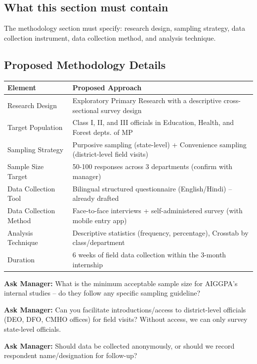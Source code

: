 \documentclass[12pt,a4paper]{article}
\newcommand{\managerQ}[1]{%
  \begin{tcolorbox}[colback=govgold!10,colframe=govgold,boxrule=0.5pt,arc=2mm,
    left=4pt,right=4pt,top=2pt,bottom=2pt]
    \small\textbf{Ask Manager:} #1
  \end{tcolorbox}
}
\begin{document}
\subsection{What this section must contain}
The methodology section must specify: research design, sampling strategy, data collection instrument, data collection method, and analysis technique.

\subsection{Proposed Methodology Details}

\begin{tabularx}{\textwidth}{@{}lX@{}}
\toprule
\textbf{Element} & \textbf{Proposed Approach} \\
\midrule
Research Design & Exploratory Primary Research with a descriptive cross-sectional survey design \\
Target Population & Class I, II, and III officials in Education, Health, and Forest depts. of MP \\
Sampling Strategy & Purposive sampling (state-level) + Convenience sampling (district-level field visits) \\
Sample Size Target & 50-100 responses across 3 departments (confirm with manager) \\
Data Collection Tool & Bilingual structured questionnaire (English/Hindi) -- already drafted \\
Data Collection Method & Face-to-face interviews + self-administered survey (with mobile entry app) \\
Analysis Technique & Descriptive statistics (frequency, percentage), Crosstab by class/department \\
Duration & 6 weeks of field data collection within the 3-month internship \\
\bottomrule
\end{tabularx}

\vspace{0.4cm}
\managerQ{What is the minimum acceptable sample size for AIGGPA's internal studies -- do they follow any specific sampling guideline?}

\managerQ{Can you facilitate introductions/access to district-level officials (DEO, DFO, CMHO offices) for field visits? Without access, we can only survey state-level officials.}

\managerQ{Should data be collected anonymously, or should we record respondent name/designation for follow-up?}
\end{document}
